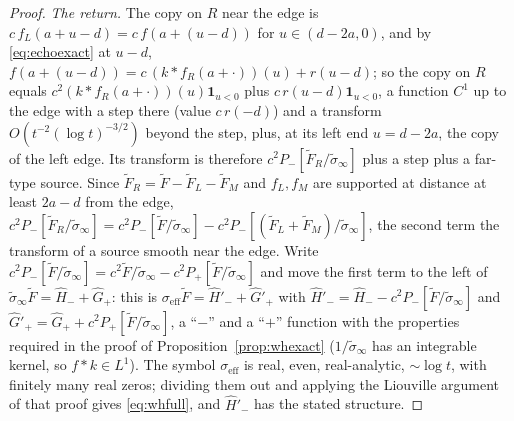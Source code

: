 \documentclass[11pt]{article}
\theoremstyle{definition}
\theoremstyle{remark}
\begin{document}
\begin{proof}
\emph{The return.} The copy on $R$ near the edge is $c\,f_L(a+u-d)=c\,f(a+(u-d))$ for $u\in(d-2a,0)$, and by \eqref{eq:echoexact} at $u-d$, $f(a+(u-d))=c\,(k*f_R(a+\cdot))(u)+r(u-d)$; so the copy on $R$ equals $c^2(k*f_R(a+\cdot))(u)\mathbf 1_{u<0}$ plus $c\,r(u-d)\mathbf 1_{u<0}$, a function $C^1$ up to the edge with a step there (value $c\,r(-d)$) and a transform $O(t^{-2}(\log t)^{-3/2})$ beyond the step, plus, at its left end $u=d-2a$, the copy of the left edge. Its transform is therefore $c^2P_-[\tilde F_R/\tilde\sigma_\infty]$ plus a step plus a far-type source. Since $\tilde F_R=\tilde F-\tilde F_L-\tilde F_M$ and $f_L,f_M$ are supported at distance at least $2a-d$ from the edge, $c^2P_-[\tilde F_R/\tilde\sigma_\infty]=c^2P_-[\tilde F/\tilde\sigma_\infty]-c^2P_-[(\tilde F_L+\tilde F_M)/\tilde\sigma_\infty]$, the second term the transform of a source smooth near the edge. Write $c^2P_-[\tilde F/\tilde\sigma_\infty]=c^2\tilde F/\tilde\sigma_\infty-c^2P_+[\tilde F/\tilde\sigma_\infty]$ and move the first term to the left of $\tilde\sigma_\infty\tilde F=\hat H_-+\hat G_+$: this is $\sigma_{\mathrm{eff}}\tilde F=\hat H'_-+\hat G'_+$ with $\hat H'_-=\hat H_--c^2P_-[\tilde F/\tilde\sigma_\infty]$ and $\hat G'_+=\hat G_++c^2P_+[\tilde F/\tilde\sigma_\infty]$, a ``$-$'' and a ``$+$'' function with the properties required in the proof of Proposition~\ref{prop:whexact} ($1/\tilde\sigma_\infty$ has an integrable kernel, so $f*k\in L^1$). The symbol $\sigma_{\mathrm{eff}}$ is real, even, real-analytic, $\sim\log t$, with finitely many real zeros; dividing them out and applying the Liouville argument of that proof gives \eqref{eq:whfull}, and $\hat H'_-$ has the stated structure.
\end{proof}
\end{document}
